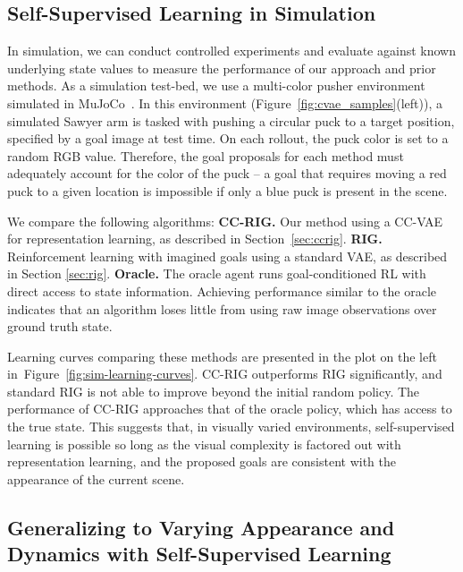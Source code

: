 \subsection{Self-Supervised Learning in Simulation}

In simulation, we can conduct controlled experiments and evaluate against known underlying state values to measure the performance of our approach and prior methods. As a simulation test-bed, we use a multi-color pusher environment simulated in MuJoCo~\cite{todorov12mujoco}. In this environment (Figure~\ref{fig:cvae_samples}(left)),
a simulated Sawyer arm is tasked with pushing a circular puck to a target position, specified by a goal image at test time. On each rollout, the puck color is set to a random RGB value. Therefore, the goal proposals for each method must adequately account for the color of the puck -- a goal that requires moving a red puck to a given location is impossible if only a blue puck is present in the scene.

We compare the following algorithms:
\textbf{CC-RIG.} Our method using a CC-VAE for representation learning, as described in Section~\ref{sec:ccrig}.
\textbf{RIG.} Reinforcement learning with imagined goals \cite{nair2018rig} using a standard VAE, as described in Section \ref{sec:rig}.
\textbf{Oracle.} The oracle agent runs goal-conditioned RL with direct access to state information. Achieving performance similar to the oracle indicates that an algorithm loses little from using raw image observations over ground truth state.

Learning curves comparing these methods are presented in the plot on the left in~Figure~\ref{fig:sim-learning-curves}. CC-RIG outperforms RIG significantly, and standard RIG is not able to improve beyond the initial random policy. The performance of CC-RIG approaches that of the oracle policy, which has access to the true state. This suggests that, in visually varied environments, self-supervised learning is possible so long as the visual complexity is factored out with representation learning, and the proposed goals are consistent with the appearance of the current scene.

\subsection{Generalizing to Varying Appearance and Dynamics with Self-Supervised Learning}


